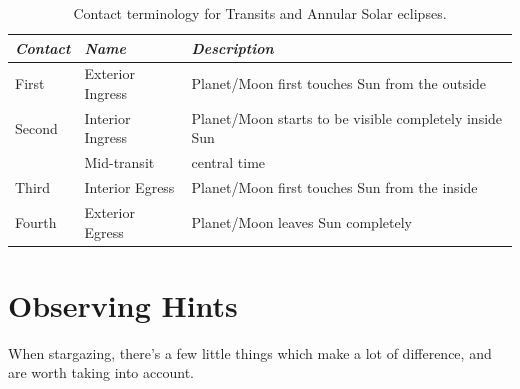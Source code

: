 \begin{table}[p]
  \centering\small
  \begin{tabular}{lll}
\toprule
\emph{Contact} & \emph{Name} & \emph{Description}\\\midrule
First  & Exterior Ingress & Planet/Moon first touches Sun from the outside\\  
Second & Interior Ingress & Planet/Moon starts to be visible completely inside Sun \\  
       & Mid-transit & central time\\
Third  & Interior Egress & Planet/Moon first touches Sun from the inside\\  
Fourth & Exterior Egress & Planet/Moon leaves Sun completely \\  
\bottomrule
\end{tabular}
\caption{Contact terminology for Transits and Annular Solar eclipses.}
\label{tab:Eclipses:ContactTimes}
\end{table}


\section{Observing Hints}
\label{sec:observing_hints}

When stargazing, there's a few little things which make a lot of
difference, and are worth taking into account.

